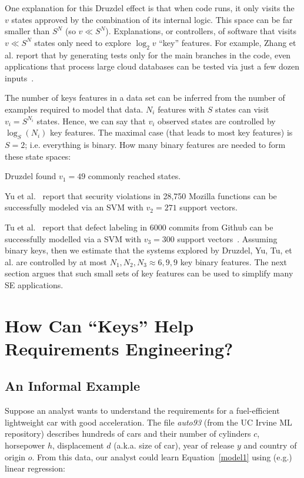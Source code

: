 One explanation for this Druzdel effect is that when code runs, it only visits the $v$ states 
approved by the combination of its internal logic. This space can be far
smaller than $S^N$ (so $v\ll S^N$). 
Explanations, or controllers, of  software that visits  
\mbox{$v\ll S^N$} states only need to explore $\log_2{v}$ ``key'' features.
For example, Zhang et al. report that by
generating tests only for the main branches in the code, even applications that process large cloud databases can be tested via just a few dozen inputs~\cite{Zhang20}.


 The number of   keys features in a data set can be inferred from
the number
of examples  required to model that data.
$N_i$ features with $S$ states can visit $v_i=S^{N_i}$  states.
Hence, we can say that $v_i$ observed states are controlled by
$\log_S{(N_i)}$ key features. The maximal case (that leads to most key features)
is $S=2$; i.e. everything is binary. 
How many binary features are needed to form these state spaces:
\bi
\item
 Druzdel found  $v_1=49$ commonly reached states.
\item
Yu et al.~\cite{zhe19} report that
security violations in 28,750 Mozilla functions can be successfully modeled via an SVM with \mbox{$v_2=271$} support vectors. 
\item Tu et al.~\cite{tu20} report that defect labeling  in  $6000$ commits from Github
can be successfully modelled via a SVM with \mbox{$v_3=300$} support vectors~\cite{tu20}. 
\ei
Assuming binary keys, then we estimate
that the  systems explored by Druzdel, Yu, Tu, et al.
are   controlled
by at most 
$N_1,N_2,N_3\approx 6,9,9$
key binary features.
The next section argues that such small sets of key features
can be used to simplify many SE applications.

 
\section{  How Can ``Keys'' Help  Requirements Engineering? }
  
 
 \subsection{An Informal Example}\label{keyseg}


Suppose an analyst wants to understand 
the requirements for 
a fuel-efficient lightweight car with good acceleration. The file
{\em auto93} (from the UC Irvine ML
  repository) describes hundreds of  cars and their number of cylinders $c$, horsepower $h$, displacement $d$ (a.k.a. size of car), year of release $y$ and country of origin $o$.
From this data, our analyst could learn   Equation~\ref{model1} using
(e.g.) linear regression:
 
